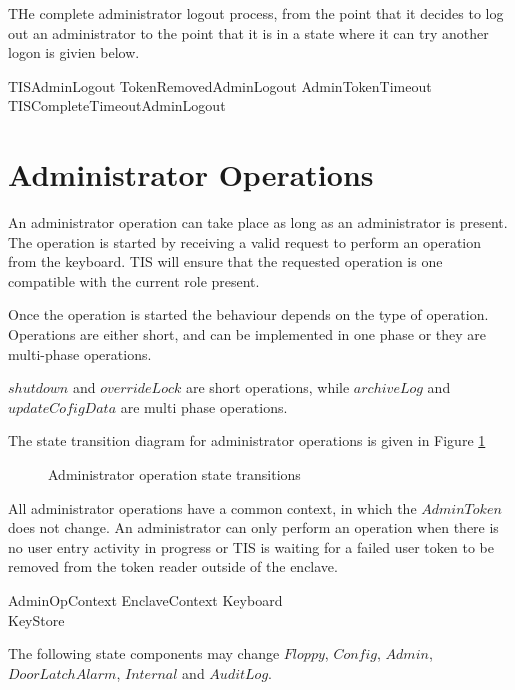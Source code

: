 THe complete administrator logout process, from the point that it
decides to log out an administrator to the point that it is in a state
where it can try another logon is givien below.

\begin{zed}
TISAdminLogout   TokenRemovedAdminLogout \lor AdminTokenTimeout \lor TISCompleteTimeoutAdminLogout 
\end{zed}

\section{Administrator Operations}
An administrator operation can take place as long as an administrator
is present. The operation is started by receiving a valid request to
perform an operation from the keyboard. TIS will ensure that the
requested operation is one compatible with the current role present.

Once the operation is started the behaviour depends on the type of
operation. Operations are either short, and can be implemented in one
phase or they are multi-phase operations. 

$shutdown$ and $overrideLock$ are short operations, while $archiveLog$
and $updateCofigData$ are multi phase operations.

The state transition diagram for administrator operations is given in
Figure \ref{fig:adminOp}

\begin{figure}[htbp]
  \begin{center}
    \leavevmode
    \caption{Administrator operation state transitions}
    \label{fig:adminOp}
  \end{center}
\end{figure}

All administrator operations have a common context, in which the
$AdminToken$ does not change.
An administrator can only perform an operation when there is no user 
entry activity
in progress or TIS is waiting for a failed user token to be removed
from the token reader outside of the enclave.


\begin{schema}{AdminOpContext}
        EnclaveContext
\also
        \Xi Keyboard
\\      \Xi KeyStore
\end{schema}
\begin{Zcomment}
\item
The following state components may change   
$Floppy$, $Config$, $Admin$, $DoorLatchAlarm$, $Internal$ and $AuditLog$. 
\end{Zcomment}

